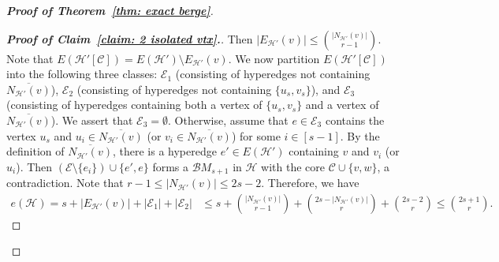\documentclass[11pt]{article}
\numberwithin{equation}{section}
\newcommand\cB{{\mathcal B}}
\newcommand\cC{{\mathcal C}}
\newcommand\cE{{\mathcal E}}
\newcommand\cH{{\mathcal H}}
\begin{document}
\begin{proof}[\bf Proof of Theorem~\ref{thm: exact berge}]
\begin{proof}[{\bf{Proof of Claim~\ref{claim: 2 isolated vtx}.}}]
    Then $|E_{\cH'}(v)|\leq \binom{|N_{\cH'}(v)|}{r-1}$.
    Note that $E(\cH'[\cC])=E(\cH')\setminus E_{\cH'}(v)$.
    We now partition $E(\cH'[\cC])$ into the following three classes:
    $\cE_1$ (consisting of hyperedges not containing $\overline{N_{\cH'}(v)}$),
    $\cE_2$ (consisting of hyperedges not containing $\{u_s,v_s\}$),
    and $\cE_3$ (consisting of hyperedges containing both a vertex of $\{u_s,v_s\}$ and a vertex of $\overline{N_{\cH'}(v)}$).
    We assert that $\cE_3=\emptyset$. Otherwise, assume that $e\in \cE_3$ contains the vertex $u_s$ and $u_i\in \overline{N_{\cH'}(v)}$ (or $v_i\in \overline{N_{\cH'}(v)}$) for some $i\in [s-1]$.
    By the definition of $\overline{N_{\cH'}(v)}$, there is a hyperedge $e'\in E(\cH')$ containing $v$ and $v_i$ (or $u_i$). Then $(\cE\setminus \{e_i\})\cup \{e',e\}$ forms a $\cB M_{s+1}$ in $\cH$ with the core $\cC\cup \{v,w\}$, a contradiction.
    Note that $r-1\leq|N_{\cH'}(v)|\leq 2s-2$. Therefore, we have
     \begin{equation*}
    \begin{aligned}
        e(\cH)= s+|E_{\cH'}(v)|+|\cE_1|+|\cE_2| &\leq s + \binom{|N_{\cH'}(v)|}{r-1} + \binom{2s-|N_{{\cH'}}(v)|}{r} + \binom{2s-2}{r}
        \le \binom{2s+1}{r}.
    \end{aligned}
     \end{equation*}
     \end{proof}


\end{proof}
\end{document}
